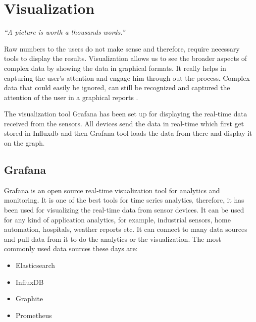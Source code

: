 \chapter{Visualization}


\makeatletter
\renewcommand{\@chapapp}{}%
\newenvironment{chapquote}[2][2em]
{\setlength{\@tempdima}{#1}%
	\def\chapquote@author{#2}%
	\parshape 1 \@tempdima \dimexpr{}\@tempdima\relax%
	\itshape}

\makeatother

\begin{center}
\begin{chapquote}{}
	``A picture is worth a thousands words.''
\end{chapquote}
\end{center}

Raw numbers to the users do not make sense and therefore, require necessary tools to display the results. Visualization allows us to see the broader aspects of complex data by showing the data in graphical formats. It really helps in capturing the user's attention and engage him through out the process. Complex data that could easily be ignored, can still be recognized and captured the attention of the user in a graphical reports \cite{quora:Sulakshana}.

The visualization tool Grafana has been set up for displaying the real-time data received from the sensors. All devices send the data in real-time which first get stored in Influxdb and then Grafana tool loads the data from there and display it on the graph. 

\section{Grafana}
Grafana is an open source real-time visualization tool for analytics and monitoring. It is one of the best tools for time series analytics, therefore, it has been used for visualizing the real-time data from sensor devices. It can be used for any kind of application analytics, for example, industrial sensors, home automation, hospitals, weather reports etc. It can connect to many data sources and pull data from it to do the analytics or the visualization. The most commonly used data sources these days are:

\begin{itemize}
	\item Elasticsearch
	\item InfluxDB
	\item Graphite
	\item Prometheus  
\end{itemize}

